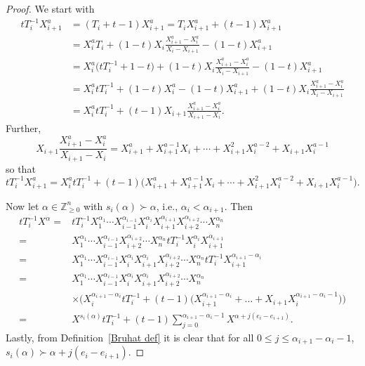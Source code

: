 \documentclass[pdftex]{sigma}
\numberwithin{equation}{section}
\theoremstyle{definition}
\begin{document}
\begin{proof}
We start with
 \begin{align*}
 tT_i^{-1}X_{i+1}^{a}&= (T_i+t-1)X_{i+1}^a = T_iX_{i+1}^{a} + (t-1)X_{i+1}^a \\
 &= X_i^{a}T_i + (1-t)X_i\frac{X_{i+1}^{a}-X_i^{a}}{X_i-X_{i+1}} -(1-t)X_{i+1}^{a} \\
 & = X_i^a\bigl(tT_i^{-1}+1-t\bigr) + (1-t)X_i\frac{X_{i+1}^a - X_i^a}{X_i-X_{i+1}} -(1-t)X_{i+1}^{a} \\
 & = X_i^{a}tT_i^{-1} + (1-t)X_i^{a} -(1-t)X_{i+1}^{a} + (1-t)X_i\frac{X_{i+1}^{a}-X_i^{a}}{X_i-X_{i+1}}\\
 &= X_i^{a}tT_i^{-1} + (t-1)X_{i+1}\frac{X_{i+1}^{a}-X_i^{a}}{X_{i+1}-X_i}.
 \end{align*}
Further,
\[
 X_{i+1}\frac{X_{i+1}^{a}-X_i^{a}}{X_{i+1}-X_i} = X_{i+1}^{a} + X_{i+1}^{a-1}X_i + \cdots + X_{i+1}^2X_i^{a-2} + X_{i+1}X_i^{a-1}
\]
 so that
\[
 tT_i^{-1}X_{i+1}^{a} = X_i^{a}tT_i^{-1} + (t-1)\bigl(X_{i+1}^{a} + X_{i+1}^{a-1}X_i + \cdots + X_{i+1}^2X_i^{a-2} + X_{i+1}X_i^{a-1}\bigr).
\]


Now let $\alpha \in \mathbb{Z}_{\geq 0}^{n}$ with $s_i(\alpha) \succ \alpha$, i.e., $\alpha_i < \alpha_{i+1}$.
Then
\begin{align*}
 tT_i^{-1}X^{\alpha} ={}& tT_i^{-1}X_1^{\alpha_1}\cdots X_{i-1}^{\alpha_{i-1}}X_i^{\alpha_i}X_{i+1}^{\alpha_{i+1}}X_{i+2}^{\alpha_{i+2}}\cdots X_n^{\alpha_n} \\
 ={}& X_1^{\alpha_1}\cdots X_{i-1}^{\alpha_{i-1}}X_{i+2}^{\alpha_{i+2}}\cdots X_n^{\alpha_n} tT_i^{-1}X_i^{\alpha_i}X_{i+1}^{\alpha_{i+1}} \\
 ={}& X_1^{\alpha_1}\cdots X_{i-1}^{\alpha_{i-1}}X_i^{\alpha_i}X_{i+1}^{\alpha_{i}}X_{i+2}^{\alpha_{i+2}}\cdots X_n^{\alpha_n} tT_i^{-1}X_{i+1}^{\alpha_{i+1}-\alpha_{i}} \\
 ={}& X_1^{\alpha_1}\cdots X_{i-1}^{\alpha_{i-1}}X_i^{\alpha_i}X_{i+1}^{\alpha_{i}}X_{i+2}^{\alpha_{i+2}}\cdots X_n^{\alpha_n} \\
 & \times \bigl( X_i^{\alpha_{i+1}-\alpha_i}tT_i^{-1} + (t-1)\bigl( X_{i+1}^{\alpha_{i+1}-\alpha_i} + \dots + X_{i+1}X_i^{\alpha_{i+1}-\alpha_i-1}\bigr) \bigr) \\
 ={}& X^{s_i(\alpha)}tT_i^{-1} + (t-1)\sum_{j=0}^{\alpha_{i+1}-\alpha_i-1} X^{\alpha + j(e_i - e_{i+1})}.
\end{align*}
 Lastly, from Definition~\ref{Bruhat def} it is clear that for all $0 \leq j \leq \alpha_{i+1}-\alpha_i-1$, $s_i(\alpha) \succ \alpha + j(e_i - e_{i+1})$.
\end{proof}
\end{document}
